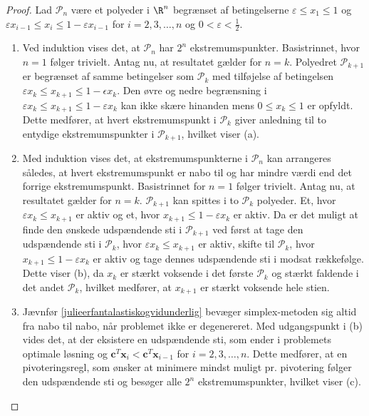 \begin{proof}
%
Lad $\mathcal{P}_n$ være et polyeder i $\R^n$ begrænset af betingelserne $\varepsilon \leq x_1 \leq 1$ og $\varepsilon x_{i-1} \leq x_i \leq 1 - \varepsilon x_{i-1}$ for $i = 2, 3, \ldots, n$ og $0 < \varepsilon < \frac{1}{2}$.
%
\begin{enumerate}[label = (\alph*)]
\item Ved induktion vises det, at $\mathcal{P}_n$ har $2^n$ ekstremumspunkter. 
Basistrinnet, hvor $n=1$ følger trivielt.
Antag nu, at resultatet gælder for $n=k$.
Polyedret $\mathcal{P}_{k+1}$ er begrænset af samme betingelser som $\mathcal{P}_{k}$ med tilføjelse af betingelsen $\varepsilon x_{k} \leq x_{k+1} \leq 1 - \epsilon x_{k}$.
Den øvre og nedre begrænsning i $\varepsilon x_{k} \leq x_{k+1} \leq 1 - \varepsilon x_{k}$ kan ikke skære hinanden mens $ 0 \leq x_k \leq 1$ er opfyldt.
Dette medfører, at hvert ekstremumspunkt i $\mathcal{P}_{k}$ giver anledning til to entydige ekstremumspunkter i $\mathcal{P}_{k+1}$, hvilket viser (a).
\item Med induktion vises det, at ekstremumspunkterne i $\mathcal{P}_n$ kan arrangeres således, at hvert ekstremumspunkt er nabo til og har mindre værdi end det forrige ekstremumspunkt.
Basistrinnet for $n=1$ følger trivielt.
Antag nu, at resultatet gælder for  $n = k$.
$\mathcal{P}_{k+1}$ kan spittes i to $\mathcal{P}_{k}$ polyeder.
Et, hvor $\varepsilon x_{k} \leq x_{k+1}$ er aktiv og et, hvor $x_{k+1} \leq 1 - \varepsilon x_{k}$ er aktiv.
Da er det muligt at finde den ønskede udspændende sti i $\mathcal{P}_{k+1}$ ved først at tage den udspændende sti i $\mathcal{P}_{k}$, hvor $\varepsilon x_{k} \leq x_{k+1}$ er aktiv, skifte til $\mathcal{P}_{k}$, hvor $x_{k+1} \leq 1 - \varepsilon x_{k}$ er aktiv og tage dennes udspændende sti i modsat rækkefølge.
Dette viser (b), da $x_k$ er stærkt voksende i det første $\mathcal{P}_{k}$ og stærkt faldende i det andet $\mathcal{P}_{k}$, hvilket medfører, at $x_{k+1}$ er stærkt voksende hele stien.
\item Jævnfør \ref{julieerfantalastiskogvidunderlig} bevæger simplex-metoden sig altid fra nabo til nabo, når problemet ikke er degenereret. Med udgangspunkt i (b) vides det, at der eksistere en udspændende sti, som ender i problemets optimale løsning og $\textbf{c}^T\textbf{x}_i < \textbf{c}^T\textbf{x}_{i-1}$ for $i = 2, 3, \ldots ,n$.
Dette medfører, at en pivoteringsregl, som ønsker at minimere mindst muligt pr. pivotering følger den udspændende sti og besøger alle $2^n$ ekstremumspunkter, hvilket viser (c).
\end{enumerate}
\end{proof}

